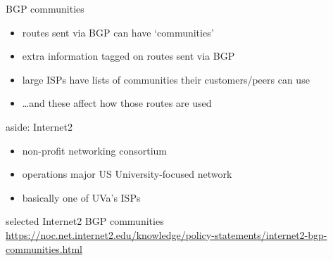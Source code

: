 \begin{frame}{BGP communities}
    \begin{itemize}
    \item routes sent via BGP can have `communities'
    \item extra information tagged on routes sent via BGP
    \vspace{.5cm}
    \item large ISPs have lists of communities their customers/peers can use
    \item \ldots and these affect how those routes are used
    \end{itemize}
\end{frame}

\begin{frame}{aside: Internet2}
    \begin{itemize}
    \item non-profit networking consortium
    \item operations major US University-focused network
    \item basically one of UVa's ISPs
    \end{itemize}
\end{frame}

\begin{frame}{selected Internet2 BGP communities}
{\fontsize{9}{10}\selectfont\url{https://noc.net.internet2.edu/knowledge/policy-statements/internet2-bgp-communities.html}}
\end{frame}


